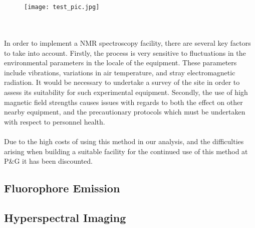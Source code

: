 \documentclass[a4paper ,12pt]{article}
\begin{document}
\\\\
\begin{figure}
\centering
\texttt{[image: test\_pic.jpg]}
\end{figure}\\\\

In order to implement a NMR spectroscopy facility, there are several key factors to take into account. Firstly, the process is very sensitive to fluctuations in the environmental parameters in the locale of the equipment. These parameters include vibrations, variations in air temperature, and stray electromagnetic radiation. It would be necessary to undertake a survey of the site in order to assess its suitability for such experimental equipment. Secondly, the use of high magnetic field strengths causes issues with regards to both the effect on other nearby equipment, and the precautionary protocols which must be undertaken with respect to personnel health.\\\\Due to the high costs of using this method in our analysis, and the difficulties arising when building a suitable facility for the continued use of this method at P\&G it has been discounted.




\subsection{Fluorophore Emission}
\subsection{Hyperspectral Imaging}
\end{document}
